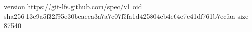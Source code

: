 version https://git-lfs.github.com/spec/v1
oid sha256:13c9a5f32f95e30bcaeea3a7a7c07f3fa1d425804cb4e64e7c41df761b7ecfaa
size 87540
